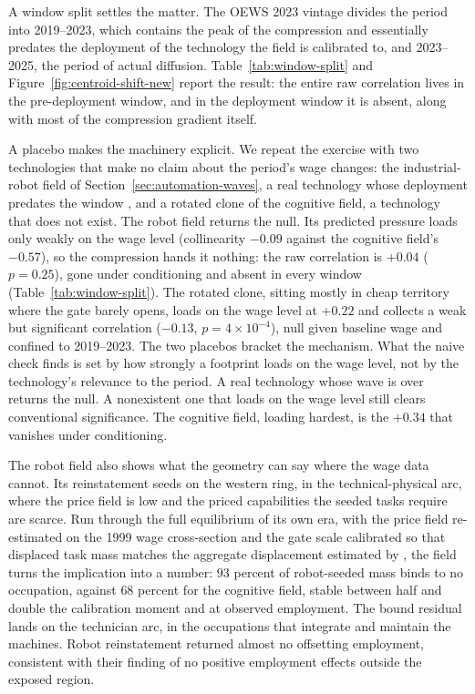 \documentclass[12pt, a4paper]{article}
\begin{document}
A window split settles the matter. The OEWS 2023 vintage divides the
period into 2019--2023, which contains the peak of the compression and
essentially predates the deployment of the technology the field is
calibrated to, and 2023--2025, the period of actual diffusion.
Table~\ref{tab:window-split} and Figure~\ref{fig:centroid-shift-new}
report the result: the entire raw
correlation lives in the pre-deployment window, and in the deployment
window it is absent, along with most of the compression gradient itself.

A placebo makes the machinery explicit. We repeat the exercise with two
technologies that make no claim about the period's wage changes: the
industrial-robot field of Section~\ref{sec:automation-waves}, a real
technology whose deployment predates the window
\parencite{acemoglu2020robots}, and a rotated clone of the cognitive
field, a technology that does not exist. The robot field returns the
null. Its predicted pressure loads only weakly on the wage level
(collinearity $-0.09$ against the cognitive field's $-0.57$), so the
compression hands it nothing: the raw correlation is $+0.04$ ($p=0.25$),
gone under conditioning and absent in every window
(Table~\ref{tab:window-split}). The rotated clone, sitting mostly in
cheap territory where the gate barely opens, loads on the wage level at
$+0.22$ and collects a weak but significant correlation ($-0.13$,
$p=4\times10^{-4}$), null given baseline wage and confined to
2019--2023. The two placebos bracket the mechanism. What the naive check
finds is set by how strongly a footprint loads on the wage level, not by
the technology's relevance to the period. A real technology whose wave
is over returns the null. A nonexistent one that loads on the wage level
still clears conventional significance. The cognitive field, loading
hardest, is the $+0.34$ that vanishes under conditioning.

The robot field also shows what the geometry can say where the wage data
cannot. Its reinstatement seeds on the western ring, in the
technical-physical arc, where the price field is low and the priced
capabilities the seeded tasks require are scarce. Run through the full
equilibrium of its own era, with the price field re-estimated on the
1999 wage cross-section and the gate scale calibrated so that displaced
task mass matches the aggregate displacement estimated by
\textcite{acemoglu2020robots}, the field turns the implication into a
number: $93$ percent of robot-seeded mass binds to no occupation,
against $68$ percent for the cognitive field, stable between half and
double the calibration moment and at observed employment. The bound
residual lands on the technician arc, in the occupations that integrate
and maintain the machines. Robot reinstatement returned almost no
offsetting employment, consistent with their finding of no positive
employment effects outside the exposed region.
\end{document}
